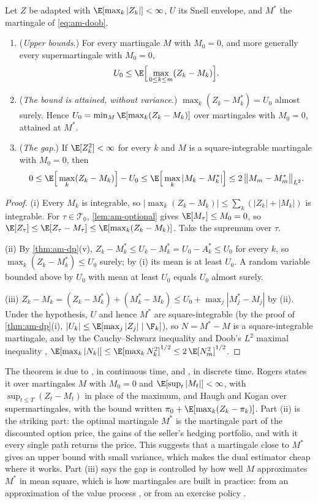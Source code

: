 \begin{theorem}[Duality]\label{thm:am-duality}
Let $Z$ be adapted with $\E[\max_k|Z_k|]<\infty$, $U$ its Snell envelope, and $M^*$ the
martingale of \eqref{eq:am-doob}.
\begin{enumerate}[label=(\roman*)]
  \item (\emph{Upper bounds}.) For every martingale $M$ with $M_0=0$, and more generally every
    supermartingale with $M_0=0$,
    \[
      U_0\le\E\Big[\max_{0\le k\le m}(Z_k-M_k)\Big].
    \]
  \item (\emph{The bound is attained, without variance}.)
    $\max_k(Z_k-M^*_k)=U_0$ almost surely. Hence
    $U_0=\min_M\E[\max_k(Z_k-M_k)]$ over martingales with $M_0=0$, attained at $M^*$.
  \item (\emph{The gap}.) If $\E[Z_k^2]<\infty$ for every $k$ and $M$ is a square-integrable
    martingale with $M_0=0$, then
    \[
      0\le\E\Big[\max_k(Z_k-M_k)\Big]-U_0\le\E\Big[\max_k|M_k-M^*_k|\Big]
      \le2\,\big\|M_m-M^*_m\big\|_{L^2}.
    \]
\end{enumerate}
\end{theorem}

\begin{proof}
(i) Every $M_k$ is integrable, so $|\max_k(Z_k-M_k)|\le\sum_k(|Z_k|+|M_k|)$ is integrable. For
$\tau\in\mathcal T_0$, \cref{lem:am-optional} gives $\E[M_\tau]\le M_0=0$, so
$\E[Z_\tau]\le\E[Z_\tau-M_\tau]\le\E[\max_k(Z_k-M_k)]$. Take the supremum over $\tau$.

(ii) By \cref{thm:am-dp}(v), $Z_k-M^*_k\le U_k-M^*_k=U_0-A^*_k\le U_0$ for every $k$, so
$\max_k(Z_k-M^*_k)\le U_0$ surely; by (i) its mean is at least $U_0$. A random variable
bounded above by $U_0$ with mean at least $U_0$ equals $U_0$ almost surely.

(iii) $Z_k-M_k=(Z_k-M^*_k)+(M^*_k-M_k)\le U_0+\max_j|M^*_j-M_j|$ by (ii). Under the
hypothesis, $U$ and hence $M^*$ are square-integrable (by the proof of \cref{thm:am-dp}(i),
$|U_k|\le\E[\max_j|Z_j|\mid\F_k]$), so $N=M^*-M$ is a square-integrable martingale, and by
the Cauchy--Schwarz inequality and Doob's $L^2$ maximal inequality
\citep[Section~4.4]{durrett}, $\E[\max_k|N_k|]\le\E[\max_kN_k^2]^{1/2}\le2\,\E[N_m^2]^{1/2}$.
\end{proof}

The theorem is due to \textcite{rogers-duality}, in continuous time, and
\textcite{haugh-kogan}, in discrete time. Rogers states it over martingales $M$ with $M_0=0$ and
$\E[\sup_t|M_t|]<\infty$, with $\sup_{t\le T}(Z_t-M_t)$ in place of the maximum, and Haugh and
Kogan over supermartingales, with the bound written $\pi_0+\E[\max_k(Z_k-\pi_k)]$. Part (ii)
is the striking part: the optimal martingale $M^*$ is the martingale part of the discounted
option price, the gains of the seller's hedging portfolio, and with it every single path
returns the price. This suggests that a martingale close to $M^*$ gives an upper bound with
small variance, which makes the dual estimator cheap where it works. Part (iii) says the gap is controlled by how well $M$ approximates $M^*$ in
mean square, which is how martingales are built in practice: from an approximation of the
value process \citep{haugh-kogan}, or from an exercise policy \citep{andersen-broadie}.

